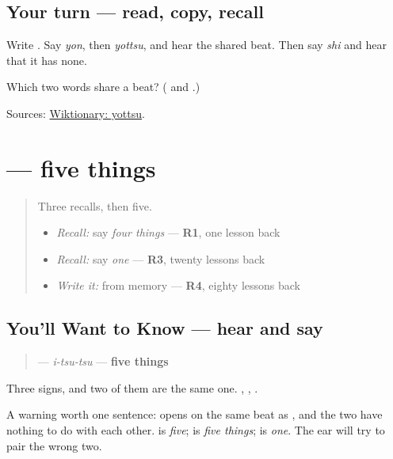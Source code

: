 \subsection*{Your turn — read, copy, recall}
Write \textbf{}. Say \emph{yon}, then \emph{yottsu}, and hear the shared beat. Then say \emph{shi} and hear that it has none.

\begin{tcolorbox}[breakable,colback=teal!4,colframe=teal!35!black,title={Before you move on}]
Which two words share a beat? (\textbf{} and \textbf{}.)

Sources: \href{https://en.wiktionary.org/wiki/\%E5\%9B\%9B\%E3\%81\%A4}{Wiktionary: yottsu}.
\end{tcolorbox}
\section[\texorpdfstring{\ja{いつつ} (itsutsu)}{いつつ (itsutsu)}]{ — five things}

\label{lesson:JA-C16-itsutsu}



\begin{quote}
Three recalls, then five.

\begin{itemize}
\raggedright
  \item \emph{Recall:} say \emph{four things} — \textbf{R1}, one lesson back
  \item \emph{Recall:} say \emph{one} — \textbf{R3}, twenty lessons back
  \item \emph{Write it:} \textbf{} from memory — \textbf{R4}, eighty lessons back
\end{itemize}
\end{quote}

\subsection*{You'll Want to Know — hear and say}
\begin{quote}
\textbf{} — \emph{i-tsu-tsu} — \textbf{five things}
\end{quote}

Three signs, and two of them are the same one. \textbf{}, \textbf{}, \textbf{}.

A warning worth one sentence: \textbf{} opens on the same beat as \textbf{}, and the two have nothing to do with each other. \textbf{} is \emph{five}; \textbf{} is \emph{five things}; \textbf{} is \emph{one}. The ear will try to pair the wrong two.

